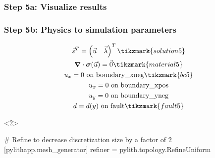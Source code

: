 \documentclass[aspectratio=169]{beamer}
\begin{document}
\begin{frame}
  \frametitle{Step 5a: Visualize results}

    
\end{frame}


\begin{frame}[t,fragile]
  \frametitle{Step 5b: Physics to simulation parameters}
  \summary{}

  \begin{minipage}[t]{0.3\textwidth}
    {\scriptsize
    \begin{gather*}
    \vec{s}^T = \left( \vec{u} \quad \vec{\lambda} \right)^T \tikzmark{solution5}\\
    \tensor{\nabla} \cdot \tensor{\sigma}(\vec{u}) = \vec{0} \tikzmark{material5}\\
    u_x = 0 \text{ on boundary\_xneg} \tikzmark{bc5}\\
    u_x = 0 \text{ on boundary\_xpos} \\
    u_y = 0 \text{ on boundary\_yneg} \\
    d = d(y) \text{ on fault} \tikzmark{fault5}
    \end{gather*}}
  \end{minipage}
  \hfill
  \begin{minipage}[t]{0.67\textwidth}
    \begin{onlyenv}<2>
      \begin{cfgcode}
        # Refine to decrease discretization size by a factor of 2
        [pylithapp.mesh_generator]
        refiner = pylith.topology.RefineUniform
      \end{cfgcode}
    \end{onlyenv}
  \end{minipage}

  
\end{frame}
\end{document}
